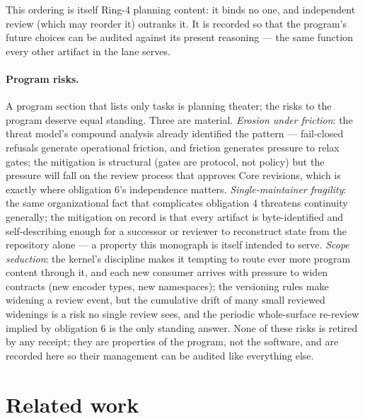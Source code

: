 This ordering is itself Ring-4 planning content: it binds no one, and independent review (which may reorder it) outranks it. It is recorded so that the program's future choices can be audited against its present reasoning --- the same function every other artifact in the lane serves.

\paragraph{Program risks.} A program section that lists only tasks is planning theater; the risks to the program deserve equal standing. Three are material. \emph{Erosion under friction}: the threat model's compound analysis already identified the pattern --- fail-closed refusals generate operational friction, and friction generates pressure to relax gates; the mitigation is structural (gates are protocol, not policy) but the pressure will fall on the review process that approves Core revisions, which is exactly where obligation 6's independence matters. \emph{Single-maintainer fragility}: the same organizational fact that complicates obligation 4 threatens continuity generally; the mitigation on record is that every artifact is byte-identified and self-describing enough for a successor or reviewer to reconstruct state from the repository alone --- a property this monograph is itself intended to serve. \emph{Scope seduction}: the kernel's discipline makes it tempting to route ever more program content through it, and each new consumer arrives with pressure to widen contracts (new encoder types, new namespaces); the versioning rules make widening a review event, but the cumulative drift of many small reviewed widenings is a risk no single review sees, and the periodic whole-surface re-review implied by obligation 6 is the only standing answer. None of these risks is retired by any receipt; they are properties of the program, not the software, and are recorded here so their management can be audited like everything else.

\section{Related work}\label{evid:related}

